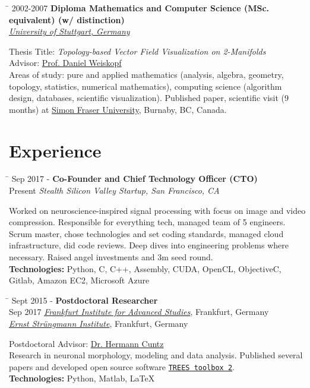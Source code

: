 \documentclass[10pt]{article} %
\newlength{\marginwidth}
\newlength{\smallertextwidth}
\newcommand{\education}[4]{
\begin{tabbing}%
\hspace{\marginwidth}\=\kill%
{#1} \> \textbf{#2}\\
\>\+ \textit{#3}\\[5pt]
\begin{minipage}{\smallertextwidth}
\vspace{5pt}
#4
\end{minipage}
\end{tabbing}
}
\newcommand{\job}[5]{
\begin{tabbing}
\hspace{\marginwidth} \= \kill
{#1} \> \textbf{#3}\\
{#2} \>\+ \textit{#4}\\[5pt]
\begin{minipage}{\smallertextwidth}
\vspace{5pt}
#5
\end{minipage}
\end{tabbing}
}
\begin{document}
\education
{2002-2007}
{Diploma Mathematics and Computer Science (MSc. equivalent) \textmd{(w/ distinction)}}
{\href{https://uni-stuttgart.de}{University of Stuttgart, Germany}}
{
Thesis Title: \textit{Topology-based Vector Field Visualization on 2-Manifolds}\\
Advisor: \href{https://www.vis.uni-stuttgart.de/institut/mitarbeiter/Weiskopf-00001/}{Prof. Daniel Weiskopf}\\[5pt]
%
Areas of study: pure and applied mathematics (analysis, algebra, geometry, topology, statistics, numerical mathematics), 
computing science (algorithm design, databases, scientific visualization).
Published paper, scientific visit (9 months) at \href{https://www.sfu.ca/}{Simon Fraser University}, Burnaby, BC, Canada. 
}



\section{Experience}
%
\job
{Sep 2017 -}{Present}
{Co-Founder and Chief Technology Officer (CTO)}
{Stealth Silicon Valley Startup\textup{, San Francisco, CA}}
{
Worked on neuroscience-inspired signal processing with focus on image and video compression. 
Responsible for everything tech, managed team of 5 engineers. Scrum master, chose technologies and
set coding standards, managed cloud infrastructure, did code reviews. Deep dives into engineering
problems where necessary. Raised angel investments and 3m seed round.\\[5pt]
\textbf{Technologies:} Python, C, C++, Assembly, CUDA, OpenCL, ObjectiveC, Gitlab, Amazon EC2, Microsoft Azure
}

\begin{tabbing}
  \hspace{\marginwidth} \= \kill
  {Sept 2015 -} \> \textbf{Postdoctoral Researcher}\\
  {Sep 2017} \> \textit{\href{https://fias.institute}{Frankfurt Institute for Advanced Studies}}, Frankfurt, Germany\\
  \>\+ \textit{\href{http://www.esi-frankfurt.de}{Ernst Strüngmann Institute}}, Frankfurt, Germany\\[5pt]
  \begin{minipage}{\smallertextwidth}
    Postdoctoral Advisor: \href{https://www.fias.science/de/neurowissenschaften/gruppen/hermann-cuntz/}{Dr. Hermann Cuntz}\\
    Research in neuronal morphology, modeling and data analysis. Published several papers and developed
    open source software \href{https://www.treestoolbox.org/}{\texttt{TREES toolbox 2}}.\\[5pt]
    \textbf{Technologies:} Python, Matlab, LaTeX  
  \end{minipage}
\end{tabbing}
\end{document}
